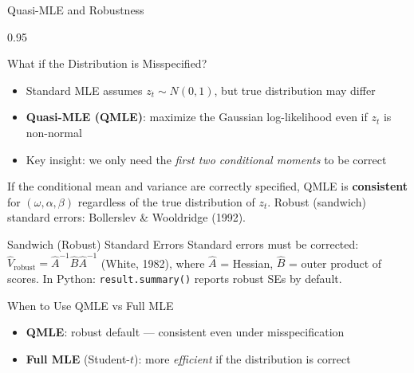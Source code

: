 \documentclass[9pt, aspectratio=169, t]{beamer}
\begin{document}
\begin{frame}{Quasi-MLE and Robustness}
    \begin{cminipage}{0.95\textwidth}
    \scriptsize
    \setlength{\abovedisplayskip}{2pt}\setlength{\belowdisplayskip}{2pt}
    \vspace{-0.3cm}
    \begin{block}{What if the Distribution is Misspecified?}
        \begin{itemize}\setlength{\itemsep}{0pt}
            \item Standard MLE assumes $z_t \sim N(0,1)$, but true distribution may differ
            \item \textbf{Quasi-MLE (QMLE)}: maximize the Gaussian log-likelihood even if $z_t$ is non-normal
            \item Key insight: we only need the \textit{first two conditional moments} to be correct
        \end{itemize}
    \end{block}
    \vspace{-2mm}
    \begin{defn}
        If the conditional mean and variance are correctly specified, QMLE is \textbf{consistent} for $(\omega, \alpha, \beta)$ regardless of the true distribution of $z_t$. Robust (sandwich) standard errors: Bollerslev \& Wooldridge (1992).
    \end{defn}
    \vspace{-2mm}
    \begin{alertblock}{Sandwich (Robust) Standard Errors}
        Standard errors must be corrected:
        $\hat{V}_{\text{robust}} = \hat{A}^{-1} \hat{B} \hat{A}^{-1}$ (White, 1982),
        where $\hat{A}$ = Hessian, $\hat{B}$ = outer product of scores. In Python: \texttt{result.summary()} reports robust SEs by default.
    \end{alertblock}
    \vspace{-2mm}
    \begin{exampleblock}{When to Use QMLE vs Full MLE}
        \begin{itemize}\setlength{\itemsep}{0pt}
            \item \textbf{QMLE}: robust default --- consistent even under misspecification
            \item \textbf{Full MLE} (Student-$t$): more \textit{efficient} if the distribution is correct
        \end{itemize}
    \end{exampleblock}
    \end{cminipage}
\end{frame}
\end{document}
